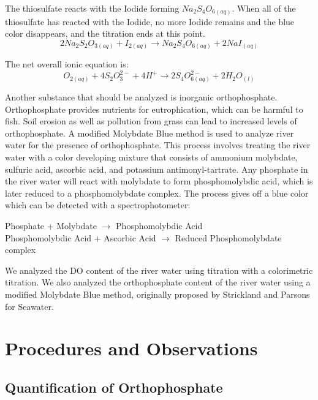 The thiosulfate reacts with the Iodide forming $Na_2S_4O_{6(aq)}$. When all of the thiosulfate has reacted with the Iodide, no more Iodide remains and the blue color disappears, and the titration ends at this point.
\begin{equation}
2Na_2S_2O_{3(aq)} + I_{2(aq)} \longrightarrow Na_2S_4O_{6(aq)} + 2NaI_{(aq)}
\end{equation}

The net overall ionic equation is:
\begin{equation}
O_{2(aq)} + 4S_2O_3^{2-} + 4H^{+} \longrightarrow 2S_4O_{6(aq)}^{2-} + 2H_2O_{(l)}
\end{equation}

Another substance that should be analyzed is inorganic orthophosphate. Orthophosphate provides nutrients for eutrophication, which can be harmful to fish. Soil erosion as well as pollution from grass can lead to increased levels of orthophosphate. A modified Molybdate Blue method is used to analyze river water for the presence of orthophosphate. This process involves treating the river water with a color developing mixture that consists of ammonium molybdate, sulfuric acid, ascorbic acid, and potassium antimonyl-tartrate. Any phosphate in the river water will react with molybdate to form phosphomolybdic acid, which is later reduced to a phosphomolybdate complex. The process gives off a blue color which can be detected with a spectrophotometer:

\begin{center}
Phosphate + Molybdate $\longrightarrow$ Phosphomolybdic Acid\\
Phosphomolybdic Acid + Ascorbic Acid $\longrightarrow$ Reduced Phosphomolybdate complex\\
\end{center}

We analyzed the DO content of the river water using titration with a colorimetric titration. We also analyzed the orthophosphate content of the river water using a modified Molybdate Blue method, originally proposed by Strickland and Parsons for Seawater.\cite{labmanual}

\section{Procedures and Observations}
\subsection{Quantification of Orthophosphate}

